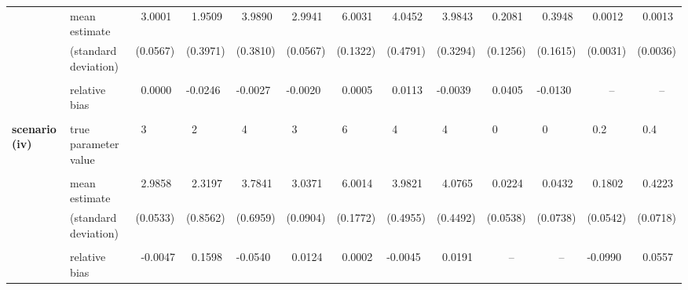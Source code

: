 \documentclass[11pt]{article}
\begin{document}
\begin{sidewaystable}[!p]
\begin{center}
{\begin{tabular}{|l|l|lllllllllll|}
& mean estimate & ~3.0001 & ~1.9509 & ~3.9890 & ~2.9941 & ~6.0031 & ~4.0452 & ~3.9843 & ~0.2081 & ~0.3948 & ~0.0012 & ~0.0013 \\
& (standard deviation) & (0.0567) & (0.3971) & (0.3810) & (0.0567) & (0.1322) & (0.4791) & (0.3294) & (0.1256) & (0.1615) & (0.0031) & (0.0036)
\\ \vspace*{-2mm} & & & & & & & & & & & & \\
& relative bias & ~0.0000 & -0.0246 & -0.0027 & -0.0020 & ~0.0005 & ~0.0113 & -0.0039 & ~0.0405 & -0.0130 & ~~~~-- & ~~~~--
\\ \hline \vspace*{-2mm} & & & & & & & & & & & & \\
 {\bf scenario (iv)} & true parameter value & ~3 & ~2 & ~4 & ~3 & ~6 & ~4 & ~4 & ~0 & ~0 & ~0.2 & ~0.4 
\\ \vspace*{-2mm} & & & & & & & & & & & & \\ 
& mean estimate & ~2.9858 & ~2.3197 & ~3.7841 & ~3.0371 & ~6.0014 & ~3.9821 & ~4.0765 & ~0.0224 & ~0.0432 & ~0.1802 & ~0.4223 \\
& (standard deviation) & (0.0533) & (0.8562) & (0.6959) & (0.0904) & (0.1772) & (0.4955) & (0.4492) & (0.0538) & (0.0738) & (0.0542) & (0.0718)
\\ \vspace*{-2mm} & & & & & & & & & & & & \\
& relative bias & ~-0.0047 & ~0.1598 & -0.0540 & ~0.0124 & ~0.0002 & -0.0045 & ~0.0191 & ~~~~-- & ~~~~-- & -0.0990 & ~0.0557

\end{tabular}}
\end{center}
\end{sidewaystable}
\end{document}
